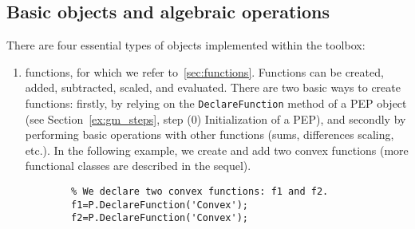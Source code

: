 \documentclass[11pt,a4paper]{article}
\begin{document}
	\subsection{Basic objects and algebraic operations}\label{sec:basicobjects}
	There are four essential types of objects implemented within the toolbox:
	\begin{enumerate}
		\item functions, for which we refer to~\ref{sec:functions}. Functions can be created, added, subtracted, scaled, and evaluated. There are two basic ways to create functions: firstly, by relying on the \verb?DeclareFunction? method of a PEP object (see Section~\ref{ex:gm_steps}, step (0) Initialization of a PEP), and secondly by performing basic operations with other functions (sums, differences scaling, etc.). In the following example, we create and add two convex functions (more functional classes are described in the sequel).\\[-1cm]
		\begin{lstlisting}
		% We declare two convex functions: f1 and f2.
		f1=P.DeclareFunction('Convex');
		f2=P.DeclareFunction('Convex');


\end{lstlisting}
\end{enumerate}
\end{document}

